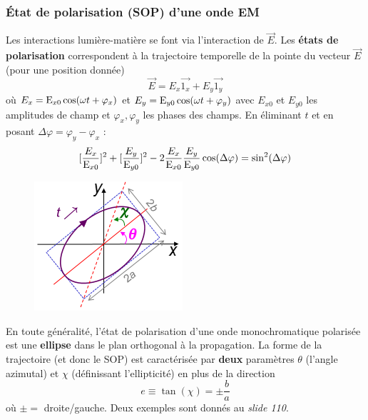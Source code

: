 	\subsubsection{État de polarisation (SOP) d'une onde EM}
	Les interactions lumière-matière se font via l'interaction de $\vec{E}$. Les \textbf{états de
	polarisation} correspondent à la trajectoire temporelle de la pointe du vecteur $\vec{E}$ (pour une
	position donnée)
	\begin{equation}
	\vec{E} = E_x\vec{1_x}+E_y\vec{1_y}
	\end{equation}
	où ${E_x} = {{\rm{E}}_{x0}}\cos (\omega t + {\varphi _x})$ et ${E_y} = {{\rm{E}}_{y0}}\cos (\omega
	 t + {\varphi _y})$ avec $E_{x0}$ et $E_{y0}$ les amplitudes de champ et $\varphi_x, \varphi_y$
	 les phases des champs. En éliminant $t$ et en posant $\Delta\varphi = \varphi_y-\varphi_x$ :
	 \begin{equation}
	 {[\frac{{{E_x}}}{{{{\rm{E}}_{x0}}}}]^2} + {[\frac{{{E_y}}}{{{{\rm{E}}_{y0}}}}]^2} -
	  2\frac{{{E_x}}}{{{{\rm{E}}_{x0}}}}\frac{{{E_y}}}{{{{\rm{E}}_{y0}}}}\cos (\Delta \varphi ) =
	   {\sin ^2}(\Delta \varphi )
	 \end{equation}
\newpage

	\begin{figure}
	\includegraphics[scale=0.65]{ch1/image40}
	\end{figure}
	 En toute généralité, l'état de polarisation d'une onde
	monochromatique polarisée est une \textbf{ellipse} dans le plan orthogonal à la propagation. 
	La forme de la trajectoire (et donc le SOP) est caractérisée par \textbf{deux} paramètres $\theta$
	(l'angle azimutal) et $\chi$ (définissant l'ellipticité) en plus de la direction
	\begin{equation}
	e \equiv \tan (\chi ) =  \pm \frac{b}{a}
	\end{equation}
	où $\pm =$ droite/gauche. Deux exemples sont donnés au \textit{slide 110}.
	
